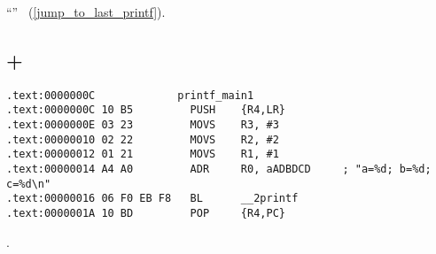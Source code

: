 ``\SwitchCaseDefaultSectionName'' 
~(\ref{jump_to_last_printf}).

\subsection{\OptimizingKeil + \ThumbMode}

\begin{lstlisting}[caption=\OptimizingKeil + \ThumbMode]
.text:0000000C             printf_main1
.text:0000000C 10 B5         PUSH    {R4,LR}
.text:0000000E 03 23         MOVS    R3, #3
.text:00000010 02 22         MOVS    R2, #2
.text:00000012 01 21         MOVS    R1, #1
.text:00000014 A4 A0         ADR     R0, aADBDCD     ; "a=%d; b=%d; c=%d\n"
.text:00000016 06 F0 EB F8   BL      __2printf
.text:0000001A 10 BD         POP     {R4,PC}
\end{lstlisting}

.


